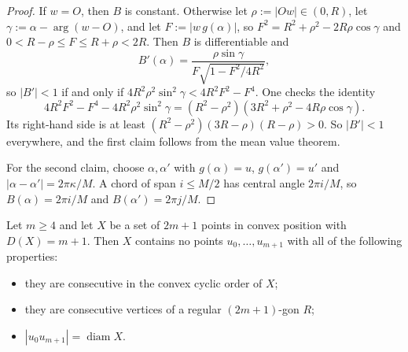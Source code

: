 \begin{proof}
If $w=O$, then $B$ is constant. Otherwise let $\rho:=|Ow|\in(0,R)$, let $\gamma:=\alpha-\arg(w-O)$, and let $F:=|w\,g(\alpha)|$, so $F^2=R^2+\rho^2-2R\rho\cos\gamma$ and $0<R-\rho\le F\le R+\rho<2R$. Then $B$ is differentiable and
\[
B'(\alpha)=\frac{\rho\sin\gamma}{F\sqrt{1-F^2/4R^2}},
\]
so $|B'|<1$ if and only if $4R^2\rho^2\sin^2\gamma<4R^2F^2-F^4$. One checks the identity
\[
4R^2F^2-F^4-4R^2\rho^2\sin^2\gamma=(R^2-\rho^2)(3R^2+\rho^2-4R\rho\cos\gamma).
\]
Its right-hand side is at least $(R^2-\rho^2)(3R-\rho)(R-\rho)>0$. So $|B'|<1$ everywhere, and the first claim follows from the mean value theorem.

For the second claim, choose $\alpha,\alpha'$ with $g(\alpha)=u$, $g(\alpha')=u'$ and $|\alpha-\alpha'|=2\pi\kappa/M$. A chord of span $i\le M/2$ has central angle $2\pi i/M$, so $B(\alpha)=2\pi i/M$ and $B(\alpha')=2\pi j/M$.
\end{proof}

\begin{proposition}\label{prop:arcext}
Let $m\ge4$ and let $X$ be a set of $2m+1$ points in convex position with $D(X)=m+1$. Then $X$ contains no points $u_0,\dots,u_{m+1}$ with all of the following properties:
\begin{itemize}[leftmargin=2em]
\item they are consecutive in the convex cyclic order of $X$;
\item they are consecutive vertices of a regular $(2m+1)$-gon $R$;
\item $|u_0u_{m+1}|=\operatorname{diam}X$.
\end{itemize}
\end{proposition}

